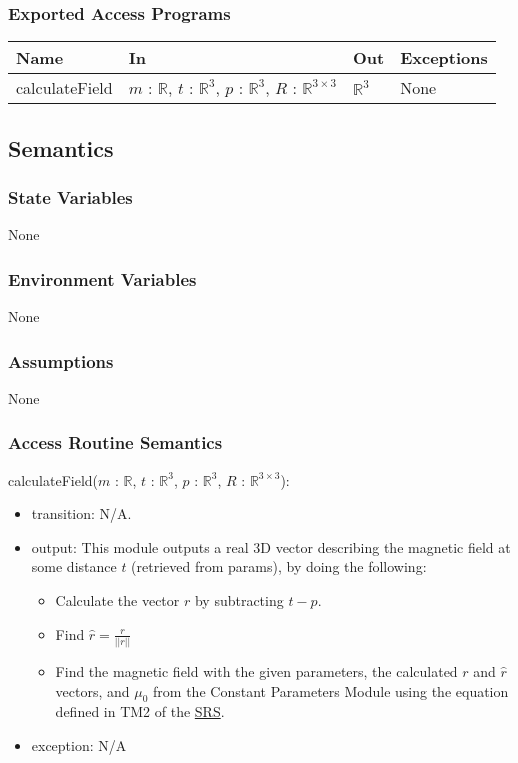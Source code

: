\documentclass[12pt, titlepage]{article}
\begin{document}
\subsubsection{Exported Access Programs}
\begin{center}
\begin{tabular}{p{3cm} p{4cm} p{4cm} p{3cm}}
\hline
\textbf{Name} & \textbf{In} & \textbf{Out} & \textbf{Exceptions} \\
\hline
calculateField & $m$ : $\mathbb{R}$, $t$ : $\mathbb{R}^3$, $p$ : $\mathbb{R}^3$, $R$ : $\mathbb{R}^{3 \times 3}$ & $\mathbb{R}^3$ & None \\
\hline
\end{tabular}
\end{center}

\subsection{Semantics}

\subsubsection{State Variables}
None

\subsubsection{Environment Variables}
None

\subsubsection{Assumptions}
None 

\subsubsection{Access Routine Semantics}

\noindent calculateField($m$ : $\mathbb{R}$, $t$ : $\mathbb{R}^3$, $p$ : $\mathbb{R}^3$, $R$ : $\mathbb{R}^{3 \times 3}$):
\begin{itemize}
\item transition: N/A.
\item output: This module outputs a real 3D vector describing the magnetic field at some distance $t$ (retrieved from params), by doing the following:
\begin{itemize}
  \item Calculate the vector $r$ by subtracting $t - p$. 
  \item Find $\hat{r} = \frac{r}{|| r ||}$ 
  \item Find the magnetic field with the given parameters, the calculated $r$ and $\hat{r}$ vectors, and $\mu_0$ from the Constant Parameters Module using the equation defined in TM2 of the \href{https://github.com/husseinsd1/optimal-em-arrangement/blob/main/docs/SRS/SRS.pdf}{SRS}. 
\end{itemize}
\item exception: N/A
\end{itemize}
\end{document}
